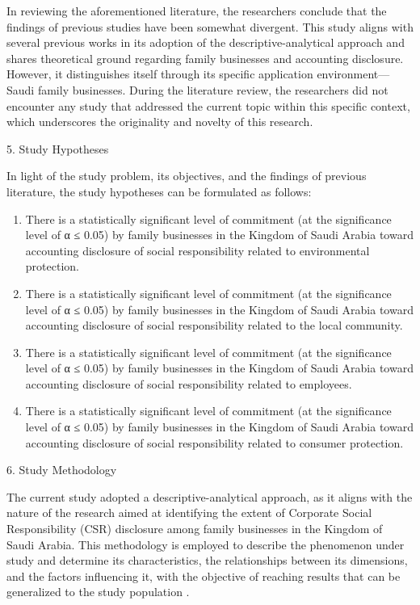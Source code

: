 \documentclass[10pt]{NSP1}
\begin{document}
In reviewing the aforementioned literature, the researchers conclude that the findings of previous studies have been somewhat divergent. This study aligns with several previous works in its adoption of the descriptive-analytical approach and shares theoretical ground regarding family businesses and accounting disclosure. However, it distinguishes itself through its specific application environment—Saudi family businesses. During the literature review, the researchers did not encounter any study that addressed the current topic within this specific context, which underscores the originality and novelty of this research.

5. Study Hypotheses

In light of the study problem, its objectives, and the findings of previous literature, the study hypotheses can be formulated as follows:

\begin{enumerate}
  \item There is a statistically significant level of commitment (at the significance level of α ≤ 0.05) by family businesses in the Kingdom of Saudi Arabia toward accounting disclosure of social responsibility related to environmental protection.
  \item There is a statistically significant level of commitment (at the significance level of α ≤ 0.05) by family businesses in the Kingdom of Saudi Arabia toward accounting disclosure of social responsibility related to the local community.
  \item There is a statistically significant level of commitment (at the significance level of α ≤ 0.05) by family businesses in the Kingdom of Saudi Arabia toward accounting disclosure of social responsibility related to employees.
  \item There is a statistically significant level of commitment (at the significance level of α ≤ 0.05) by family businesses in the Kingdom of Saudi Arabia toward accounting disclosure of social responsibility related to consumer protection.
\end{enumerate}

6. Study Methodology

The current study adopted a descriptive-analytical approach, as it aligns with the nature of the research aimed at identifying the extent of Corporate Social Responsibility (CSR) disclosure among family businesses in the Kingdom of Saudi Arabia. This methodology is employed to describe the phenomenon under study and determine its characteristics, the relationships between its dimensions, and the factors influencing it, with the objective of reaching results that can be generalized to the study population \cite{ref32}.
\end{document}
